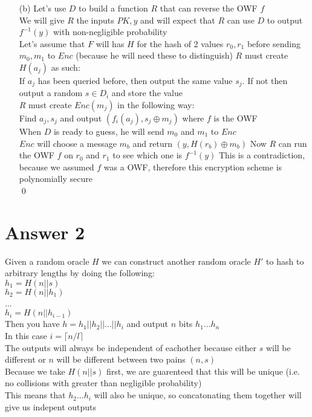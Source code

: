 \documentclass[11pt]{article}
\theoremstyle{definition}
\begin{document}
\begin{enumerate}
	\item[(b)] Let's use $D$ to build a function $R$ that can reverse the OWF $f$\\
We will give $R$ the inputs $PK, y$ and will expect that $R$ can use $D$ to output $f^{-1}(y)$ with non-negligible probability\\
Let's assume that $F$ will has $H$ for the hash of 2 values $r_0, r_1$ before sending $m_0,m_1$ to $Enc$ (because he will need these to distinguish)
$R$ must create $H(a_j)$ as such:\\
If $a_j$ has been queried before, then output the same value $s_j$.  If not then output a random $s \in D_i$ and store the value\\
$R$ must create $Enc(m_j)$ in the following way:\\
Find $a_j, s_j$ and output $(f_i(a_j), s_j \oplus m_j)$ where $f$ is the OWF\\
When $D$ is ready to guess, he will send $m_0$ and $m_1$ to $Enc$\\
$Enc$ will choose a message $m_b$ and return $(y, H(r_b) \oplus m_b)$
Now $R$ can run the OWF $f$ on $r_0$ and $r_1$ to see which one is $f^{-1}(y)$
This is a contradiction, because we assumed $f$ was a OWF, therefore this encryption scheme is polynomially secure\\
\qed

\end{enumerate}

\section*{Answer 2}
Given a random oracle $H$ we can construct another random oracle $H'$ to hash to arbitrary lengths by doing the following:\\
$h_1 = H(n || s)$\\
$h_2 = H(n || h_1)$\\
...\\
$h_i = H(n || h_{i-1})$\\
Then you have $h = h_1||h_2||...||h_i$ and output $n$ bits $h_1...h_n$\\
In this case $i = \lceil n/l \rceil$\\
The outputs will always be independent of eachother because either $s$ will be different or $n$ will be different  between two pains $(n,s)$\\
Because we take $H(n||s)$ first, we are guarenteed that this will be unique (i.e. no collisions with greater than negligible probability)\\
This means that $h_2...h_i$ will also be unique, so concatonating them together will give us indepent outputs
\end{document}
